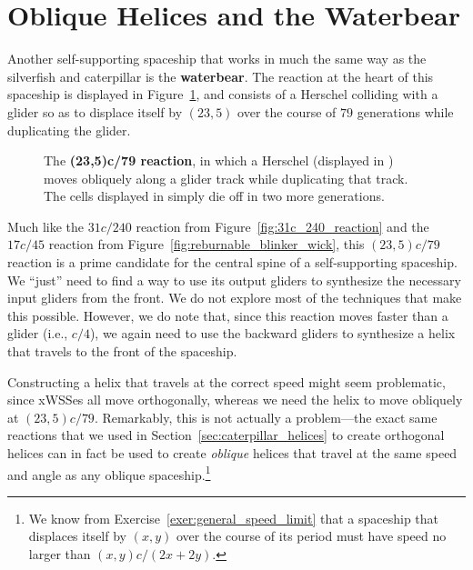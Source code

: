 \section{Oblique Helices and the Waterbear}\label{sec:waterbear}

Another self-supporting spaceship that works in much the same way as the silverfish and caterpillar is the \textbf{waterbear}. The reaction at the heart of this spaceship is displayed in Figure~\ref{fig:23_5c_79_reaction}, and consists of a Herschel colliding with a glider so as to displace itself by $(23,5)$ over the course of $79$ generations while duplicating the glider.

\begin{figure}[!htb]
	\centering
	\caption{The \textbf{(23,5)c/79 reaction}, in which a Herschel (displayed in ) moves obliquely along a glider track while duplicating that track. The cells displayed in  simply die off in two more generations.}\label{fig:23_5c_79_reaction}
\end{figure}

Much like the $31c/240$ reaction from Figure~\ref{fig:31c_240_reaction} and the $17c/45$ reaction from Figure~\ref{fig:reburnable_blinker_wick}, this $(23,5)c/79$ reaction is a prime candidate for the central spine of a self-supporting spaceship. We ``just'' need to find a way to use its output gliders to synthesize the necessary input gliders from the front. We do not explore most of the techniques that make this possible. However, we do note that, since this reaction moves faster than a glider (i.e., $c/4$), we again need to use the backward gliders to synthesize a helix that travels to the front of the spaceship.

Constructing a helix that travels at the correct speed might seem problematic, since xWSSes all move orthogonally, whereas we need the helix to move obliquely at $(23,5)c/79$. Remarkably, this is not actually a problem---the exact same reactions that we used in Section~\ref{sec:caterpillar_helices} to create orthogonal helices can in fact be used to create \emph{oblique} helices that travel at the same speed and angle as any oblique spaceship.\footnote{We know from Exercise~\ref{exer:general_speed_limit} that a spaceship that displaces itself by $(x,y)$ over the course of its period must have speed no larger than $(x,y)c/(2x+2y)$.}

